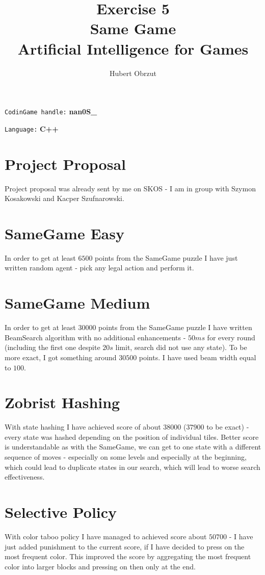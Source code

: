 \documentclass[11pt]{article}
\title{
	Exercise 5 \\
	Same Game \\
	Artificial Intelligence for Games \\
}
\author{Hubert Obrzut}
\begin{document}
	\maketitle
	
	\texttt{CodinGame handle:} \textbf{nan0S\_}
	
	\texttt{Language:} \textbf{C++}
	
	\section{Project Proposal}
	Project proposal was already sent by me on SKOS - I am in group with Szymon Kosakowski and Kacper Szufnarowski.
	
	\section{SameGame Easy}
	In order to get at least $6500$ points from the SameGame puzzle I have just written random agent - pick any legal action and perform it.
	
	\section{SameGame Medium}
	In order to get at least $30000$ points from the SameGame puzzle I have written BeamSearch algorithm with no additional enhancements - $50ms$ for every round (including the first one despite $20s$ limit, search did not use any state). To be more exact, I got something around $30500$ points. I have used beam width equal to $100$.
	
	\section{Zobrist Hashing}
	With state hashing I have achieved score of about $38000$ ($37900$ to be exact) - every state was hashed depending on the position of individual tiles. Better score is understandable as with the SameGame, we can get to one state with a different sequence of moves - especially on some levels and especially at the beginning, which could lead to duplicate states in our search, which will lead to worse search effectiveness.
	
	\section{Selective Policy}
	With color taboo policy I have managed to achieved score about $50700$ - I have just added punishment to the current score, if I have decided to press on the most frequent color. This improved the score by aggregating the most frequent color into larger blocks and pressing on then only at the end.
	
\end{document}

